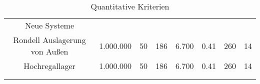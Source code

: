 \begin{longtable}{|c|c|c|c|c|c|c|c|}
  Neue Systeme                                                                                                                                                                                                                                                                                                                       \\
  Rondell Auslagerung von Außen  & 1.000.000\cite{rondell_außen_preis} & 50\cite{rondell_außen_fläche}             & 186\cite{rondell_außen_kapazität} & 6.700                                       & 0.41                                      & 260\cite{rondell_außen_durchsatz}   & 14                                          \\
  Hochregallager                 & 1.000.000\cite{hoch_preis}          & 50\cite{hoch_fläche}                      & 186\cite{hoch_kapazität}          & 6.700                                       & 0.41                                      & 260\cite{hoch_durchsatz}            & 14                                          \\

  \multicolumn{2}{c}{}                                                                                                                                                                                                                                                                                                               \\

  \caption{Quantitative Kriterien}
  \label{tab:quantitative_kriterien}
\end{longtable}
